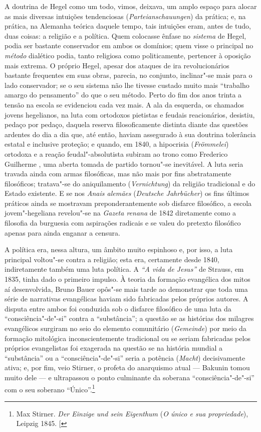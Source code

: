 A doutrina
de Hegel como
um todo, vimos, deixava, um amplo espaço para alocar as mais diversas
intuições tendenciosas (\emph{Parteianschauungen}) da prática; e, na
prática, na Alemanha teórica daquele tempo, tais intuições eram, antes
de tudo, duas coisas: a religião e a política. Quem colocasse ênfase
no \emph{sistema }de Hegel,
podia ser bastante conservador em ambos os domínios; quem visse o
principal no \emph{método }dialético podia, tanto religiosa como
politicamente, pertencer à oposição mais extrema. O
próprio Hegel,
apesar dos ataques de ira revolucionários bastante frequentes em suas
obras, parecia, no conjunto, inclinar"-se mais para o lado conservador;
se o seu sistema não lhe tivesse custado muito mais ``trabalho amargo do
pensamento'' do que o seu método. Perto do fim dos anos trinta a tensão
na escola se evidenciou cada vez mais. A ala da esquerda, os chamados
jovens hegelianos, na luta com ortodoxos pietistas e feudais
reacionários, desistiu, pedaço por pedaço, daquela reserva
filosoficamente distinta diante das questões ardentes do dia a dia que,
até então, haviam assegurado à sua doutrina tolerância estatal e
inclusive proteção; e quando, em 1840, a hipocrisia (\emph{Frömmelei})
ortodoxa e a reação feudal"-absolutista subiram ao trono como Frederico
Guilherme , uma aberta tomada de partido tornou"-se inevitável. A luta
seria travada ainda com armas filosóficas, mas não mais por fins
abstratamente filosóficos; tratava"-se do aniquilamento
(\emph{Vernichtung}) da religião tradicional e do Estado existente. E se
nos \emph{Anais alemães}
(\emph{Deutsche Jahrbücher}) os fins últimos práticos ainda se mostravam
preponderantemente sob disfarce filosófico, a escola jovem"-hegeliana
revelou"-se na \emph{Gazeta renana }de 1842 diretamente como a filosofia
da burguesia com aspirações radicais e se valeu do pretexto filosófico
apenas para ainda enganar a censura.

A política era, nessa altura, um âmbito muito espinhoso e, por isso, a
luta principal voltou"-se contra a religião; esta era, certamente desde
1840, indiretamente também uma luta política.
A \emph{``A vida de Jesus''} de Strauss,
em 1835, tinha dado o primeiro impulso. À teoria da formação evangélica
dos mitos aí desenvolvida,
Bruno Bauer opôs"-se mais tarde ao demonstrar que toda uma série de narrativas
evangélicas haviam sido fabricadas pelos próprios autores. A disputa
entre ambos foi conduzida sob o disfarce filosófico de uma luta da
``consciência"-de"-si'' contra a ``substância''; a questão se as histórias
dos milagres evangélicos surgiram no seio do elemento comunitário
(\emph{Gemeinde}) por meio da formação mitológica inconscientemente
tradicional ou se seriam fabricadas pelos próprios evangelistas foi
exagerada na questão se na história mundial a ``substância'' ou a
``consciência"-de"-si'' seria a potência (\emph{Macht}) decisivamente
ativa; e, por fim, veio Stirner,
o profeta do anarquismo atual --- Bakunin tomou muito dele --- e ultrapassou
o ponto culminante da soberana ``consciência"-de"-si'' com o seu soberano
``Único''.\footnote{Max Stirner.
  \emph{Der Einzige und sein Eigenthum }(\emph{O único e sua
  propriedade}), Leipzig 1845. {[}\versal{N.\,T.}{]}}

